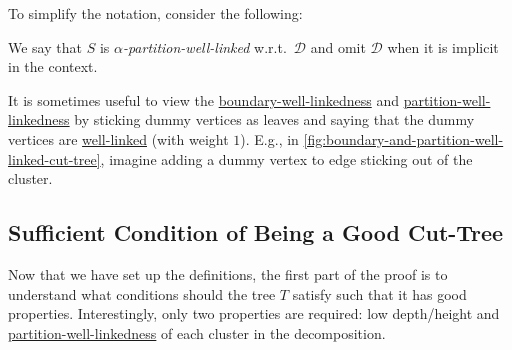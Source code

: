 To simplify the notation, consider the following:
\begin{notation}
	We say that \(S\) is \emph{\(\alpha \)-partition-well-linked} w.r.t.\ \(\mathcal{D} \) and omit \(\mathcal{D} \) when it is implicit in the context.
\end{notation}

It is sometimes useful to view the \hyperref[def:boundary-well-linked]{boundary-well-linkedness} and \hyperref[def:partition-and-boundary-well-linked]{partition-well-linkedness} by sticking dummy vertices as leaves and saying that the dummy vertices are \hyperref[def:well-linked]{well-linked} (with weight \(1\)). E.g., in \autoref{fig:boundary-and-partition-well-linked-cut-tree}, imagine adding a dummy vertex to edge sticking out of the cluster.

\subsection{Sufficient Condition of Being a Good Cut-Tree}
Now that we have set up the definitions, the first part of the proof is to understand what conditions should the tree \(T\) satisfy such that it has good properties. Interestingly, only two properties are required: low depth/height and \hyperref[def:partition-and-boundary-well-linked]{partition-well-linkedness} of each cluster in the decomposition.

